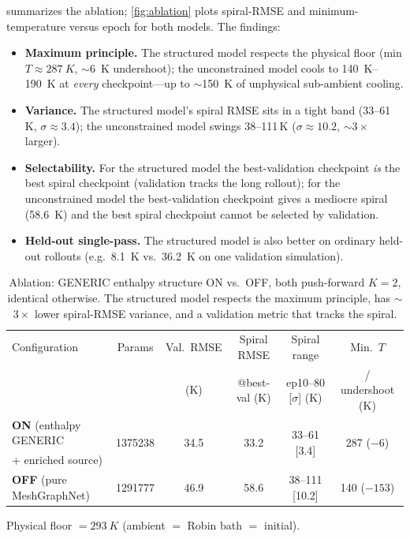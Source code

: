 \documentclass[11pt]{article}
\theoremstyle{definition}
\begin{document}
 summarizes the ablation; \cref{fig:ablation} plots spiral-RMSE and
minimum-temperature versus epoch for both models. The findings:
\begin{itemize}[leftmargin=1.4em]
  \item \textbf{Maximum principle.} The structured model respects the physical floor
  (min $T\approx\SI{287}{K}$, $\sim$\SI{6}{K} undershoot); the unconstrained model cools
  to \SIrange{140}{190}{K} at \emph{every} checkpoint---up to $\sim$\SI{150}{K} of
  unphysical sub-ambient cooling.
  \item \textbf{Variance.} The structured model's spiral RMSE sits in a tight band
  (33--61\,K, $\sigma\approx3.4$); the unconstrained model swings 38--111\,K
  ($\sigma\approx10.2$, $\sim$$3\times$ larger).
  \item \textbf{Selectability.} For the structured model the best-validation checkpoint
  \emph{is} the best spiral checkpoint (validation tracks the long rollout); for the
  unconstrained model the best-validation checkpoint gives a mediocre spiral
  (\SI{58.6}{K}) and the best spiral checkpoint cannot be selected by validation.
  \item \textbf{Held-out single-pass.} The structured model is also better on ordinary
  held-out rollouts (e.g.\ \SI{8.1}{K} vs.\ \SI{36.2}{K} on one validation simulation).
\end{itemize}

\begin{table}[t]
\centering
\caption{Ablation: GENERIC enthalpy structure ON vs.\ OFF, both push-forward $K{=}2$,
identical otherwise. The structured model respects the maximum principle, has
$\sim$$3\times$ lower spiral-RMSE variance, and a validation metric that tracks the
spiral.}
\label{tab:ablation}
\small
\begin{tabular}{lccccc}
\toprule
Configuration & Params & Val.\ RMSE & Spiral RMSE & Spiral range & Min.\ $T$ \\
              &        & (K)        & @best-val (K) & ep10--80 [$\sigma$] (K) & / undershoot (K)\\
\midrule
\textbf{ON} (enthalpy GENERIC      & \multirow{2}{*}{\num{1375238}} & \multirow{2}{*}{34.5}
  & \multirow{2}{*}{33.2} & \multirow{2}{*}{33--61 [3.4]} & \multirow{2}{*}{287 ($-6$)}\\
\;\;+ enriched source) & & & & &\\
\addlinespace[2pt]
\textbf{OFF} (pure MeshGraphNet)   & \num{1291777} & 46.9 & 58.6 & 38--111 [10.2] & 140 ($-153$)\\
\bottomrule
\end{tabular}
\par\vspace{2pt}
{\footnotesize Physical floor $=\SI{293}{K}$ (ambient $=$ Robin bath $=$ initial).}
\end{table}
\end{document}
